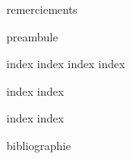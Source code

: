 


\frontmatter


\beautifultableofcontents

\printglossary

{remerciements}

{preambule}

\mainmatter

{index}
{index}
{index}
{index}


{index}
{index}


{index}
{index}


\backmatter

{bibliographie}


